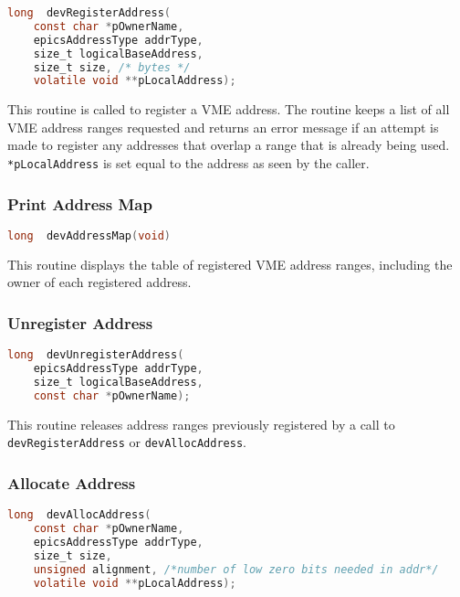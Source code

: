 \begin{lstlisting}[language=C]
long  devRegisterAddress(
    const char *pOwnerName,
    epicsAddressType addrType,
    size_t logicalBaseAddress,
    size_t size, /* bytes */
    volatile void **pLocalAddress);
\end{lstlisting}

This routine is called to register a VME address. The routine keeps a list of all VME address ranges requested and returns 
an error message if an attempt is made to register any addresses that overlap a range that is already being used. 
\verb|*pLocalAddress| is set equal to the address as seen by the caller.

\subsubsection{Print Address Map}

\begin{lstlisting}[language=C]
long  devAddressMap(void)
\end{lstlisting}

This routine displays the table of registered VME address ranges, including the owner of each registered address.

\subsubsection{Unregister Address}

\begin{lstlisting}[language=C]
long  devUnregisterAddress(
    epicsAddressType addrType,
    size_t logicalBaseAddress,
    const char *pOwnerName);
\end{lstlisting}

This routine releases address ranges previously registered by a call to \verb|devRegisterAddress| or \verb|devAllocAddress|.

\subsubsection{Allocate Address}

\begin{lstlisting}[language=C]
long  devAllocAddress(
    const char *pOwnerName,
    epicsAddressType addrType,
    size_t size,
    unsigned alignment, /*number of low zero bits needed in addr*/
    volatile void **pLocalAddress);
\end{lstlisting}

